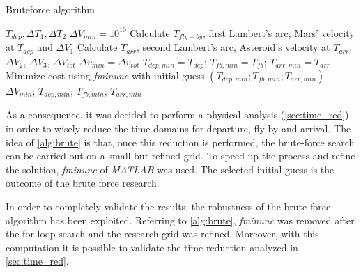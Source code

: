 \begin{algorithm}
    \caption{Bruteforce algorithm} \label{alg:brute}
    \begin{algorithmic}
    \Require $T_{dep}, \Delta T_{1}, \Delta T_{2}$
    \State $\Delta V_{min} = 10^{10}$
            \State Calculate $T_{fly-by}$, first Lambert's arc, Mars' velocity at $T_{dep}$ and  $\Delta V_1$
                \State Calculate $T_{arr}$, second Lambert's arc, Asteroid's velocity at $T_{arr}$, $\Delta V_2$, $\Delta V_3$, $\Delta V_{tot}$
                \State $\Delta v_{min} = \Delta v_{tot}$
                \State $T_{dep,min} = T_{dep} $;   $T_{fb,min}  = T_{fb}$;   $T_{arr,min} = T_{arr}$
                \EndIf
            \EndFor
        \EndFor
    \EndFor
\State Minimize cost using \textit{fminunc} with initial guess  $\left(T_{dep,min};T_{fb,min};T_{arr,min} \right)$
\\
\Return $\Delta V_{min}$; $T_{dep,min}$; $T_{fb,min}$; $T_{arr,min}$
    \end{algorithmic}
\end{algorithm}

As a consequence, it was decided to perform a physical analysis (\autoref{sec:time_red}) in order to wisely reduce the time domains for departure, fly-by and arrival. The idea of \autoref{alg:brute} is that, once this reduction is performed, the brute-force search can be carried out on a small but refined grid. To speed up the process and refine the solution, \textit{fminunc} of \textit{MATLAB} was used. The selected initial guess is the outcome of the brute force research.

In order to completely validate the results, the robustness of the brute force algorithm has been exploited. Referring to \autoref{alg:brute}, \textit{fminunc} was removed after the for-loop search and the research grid was refined. Moreover, with this computation it is possible to validate the time reduction analyzed in \autoref{sec:time_red}.